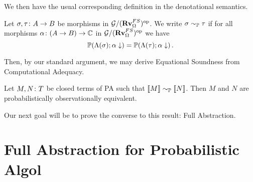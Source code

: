 We then have the usual corresponding definition in the denotational semantics.

\begin{definition}
  Let $\sigma,\tau\colon A \to B$ be morphisms in $\mathcal G/({\normalfont\textbf{Rv}}_\Omega^{FS})^{\mathrm{op}}$.  
  We write $\sigma\sim_{\mathbb{P}}\tau$ if for all morphisms $\alpha \colon (A \to B) \to \mathbb{C}$ in $\mathcal G/({\normalfont\textbf{Rv}}_\Omega^{FS})^{\mathrm{op}}$ we have
  \[
    \mathbb{P}(\Lambda(\sigma);\alpha\downarrow) = \mathbb{P}(\Lambda(\tau);\alpha\downarrow)\,.
    \]
\end{definition}

Then, by our standard argument, we may derive Equational Soundness from Computational Adequacy.

\begin{proposition}
  Let $M,N\colon T$ be closed terms of PA such that $\left\llbracket M\right\rrbracket \sim_{\mathbb{P}} \left\llbracket N\right\rrbracket$.  
  Then $M$ and $N$ are probabilistically observationally equivalent.
\end{proposition}

Our next goal will be to prove the converse to this result: Full Abstraction.

\section{Full Abstraction for Probabilistic Algol}

